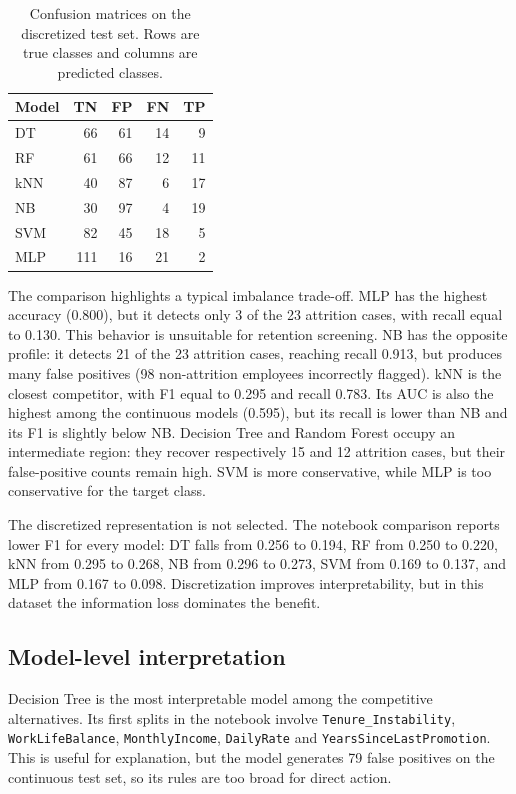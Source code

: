 \documentclass[lettersize,journal]{IEEEtran}
\begin{document}
\begin{table}[t]
\caption{Confusion matrices on the discretized test set. Rows are true classes and columns are predicted classes.}
\label{tab:cm_discr}
\centering
\scriptsize
\setlength{\tabcolsep}{3pt}
\begin{tabular}{lrrrr}
\toprule
Model & TN & FP & FN & TP \\
\midrule
DT  & 66  & 61 & 14 &  9 \\
RF  & 61  & 66 & 12 & 11 \\
kNN & 40  & 87 &  6 & 17 \\
NB  & 30  & 97 &  4 & 19 \\
SVM & 82  & 45 & 18 &  5 \\
MLP & 111 & 16 & 21 &  2 \\
\bottomrule
\end{tabular}
\end{table}

The comparison highlights a typical imbalance trade-off. MLP has the highest accuracy (0.800), but it detects only 3 of the 23 attrition cases, with recall equal to 0.130. This behavior is unsuitable for retention screening. NB has the opposite profile: it detects 21 of the 23 attrition cases, reaching recall 0.913, but produces many false positives (98 non-attrition employees incorrectly flagged). kNN is the closest competitor, with F1 equal to 0.295 and recall 0.783. Its AUC is also the highest among the continuous models (0.595), but its recall is lower than NB and its F1 is slightly below NB. Decision Tree and Random Forest occupy an intermediate region: they recover respectively 15 and 12 attrition cases, but their false-positive counts remain high. SVM is more conservative, while MLP is too conservative for the target class.

The discretized representation is not selected. The notebook comparison reports lower F1 for every model: DT falls from 0.256 to 0.194, RF from 0.250 to 0.220, kNN from 0.295 to 0.268, NB from 0.296 to 0.273, SVM from 0.169 to 0.137, and MLP from 0.167 to 0.098. Discretization improves interpretability, but in this dataset the information loss dominates the benefit.

\subsection{Model-level interpretation}
Decision Tree is the most interpretable model among the competitive alternatives. Its first splits in the notebook involve \texttt{Tenure\_Instability}, \texttt{WorkLifeBalance}, \texttt{MonthlyIncome}, \texttt{DailyRate} and \texttt{YearsSinceLastPromotion}. This is useful for explanation, but the model generates 79 false positives on the continuous test set, so its rules are too broad for direct action.
\end{document}
